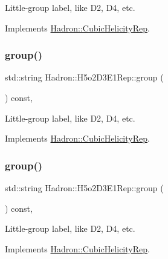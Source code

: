 Little-\/group label, like D2, D4, etc. 

Implements \mbox{\hyperlink{structHadron_1_1CubicHelicityRep_a101a7d76cd8ccdad0f272db44b766113}{Hadron\+::\+Cubic\+Helicity\+Rep}}.

\mbox{\label{structHadron_1_1H5o2D3E1Rep_a80104355e2d046afbfe385b15b96b79a}} 
\subsubsection{\texorpdfstring{group()}{group()}\hspace{0.1cm}{\footnotesize\ttfamily [3/5]}}
{\footnotesize\ttfamily std\+::string Hadron\+::\+H5o2\+D3\+E1\+Rep\+::group (\begin{DoxyParamCaption}{ }\end{DoxyParamCaption}) const\hspace{0.3cm}{\ttfamily [inline]}, {\ttfamily [virtual]}}

Little-\/group label, like D2, D4, etc. 

Implements \mbox{\hyperlink{structHadron_1_1CubicHelicityRep_a101a7d76cd8ccdad0f272db44b766113}{Hadron\+::\+Cubic\+Helicity\+Rep}}.

\mbox{\label{structHadron_1_1H5o2D3E1Rep_a80104355e2d046afbfe385b15b96b79a}} 
\subsubsection{\texorpdfstring{group()}{group()}\hspace{0.1cm}{\footnotesize\ttfamily [4/5]}}
{\footnotesize\ttfamily std\+::string Hadron\+::\+H5o2\+D3\+E1\+Rep\+::group (\begin{DoxyParamCaption}{ }\end{DoxyParamCaption}) const\hspace{0.3cm}{\ttfamily [inline]}, {\ttfamily [virtual]}}

Little-\/group label, like D2, D4, etc. 

Implements \mbox{\hyperlink{structHadron_1_1CubicHelicityRep_a101a7d76cd8ccdad0f272db44b766113}{Hadron\+::\+Cubic\+Helicity\+Rep}}.

